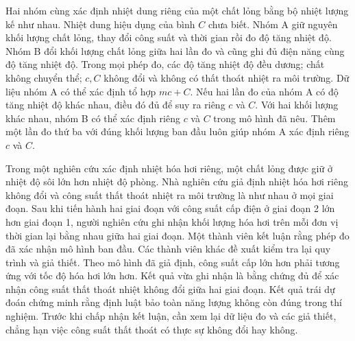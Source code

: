 \begin{ex}
Hai nhóm cùng xác định nhiệt dung riêng của một chất lỏng bằng bộ nhiệt lượng kế như nhau. Nhiệt dung hiệu dụng của bình $C$ chưa biết. Nhóm A giữ nguyên khối lượng chất lỏng, thay đổi công suất và thời gian rồi đo độ tăng nhiệt độ. Nhóm B đổi khối lượng chất lỏng giữa hai lần đo và cũng ghi đủ điện năng cùng độ tăng nhiệt độ. Trong mọi phép đo, các độ tăng nhiệt độ đều dương; chất không chuyển thể; $c,C$ không đổi và không có thất thoát nhiệt ra môi trường.
\choiceTF
{\True Dữ liệu nhóm A có thể xác định tổ hợp $mc+C$.}
{Nếu hai lần đo của nhóm A có độ tăng nhiệt độ khác nhau, điều đó đủ để suy ra riêng $c$ và $C$.}
{\True Với hai khối lượng khác nhau, nhóm B có thể xác định riêng $c$ và $C$ trong mô hình đã nêu.}
{Thêm một lần đo thứ ba với đúng khối lượng ban đầu luôn giúp nhóm A xác định riêng $c$ và $C$.}
\end{ex}

\begin{ex}
Trong một nghiên cứu xác định nhiệt hóa hơi riêng, một chất lỏng được giữ ở nhiệt độ sôi lớn hơn nhiệt độ phòng. Nhà nghiên cứu giả định nhiệt hóa hơi riêng không đổi và công suất thất thoát nhiệt ra môi trường là như nhau ở mọi giai đoạn. Sau khi tiến hành hai giai đoạn với công suất cấp điện ở giai đoạn 2 lớn hơn giai đoạn 1, người nghiên cứu ghi nhận khối lượng hóa hơi trên mỗi đơn vị thời gian lại bằng nhau giữa hai giai đoạn.  Một thành viên kết luận rằng phép đo đã xác nhận mô hình ban đầu. Các thành viên khác đề xuất kiểm tra lại quy trình và giả thiết.
\choiceTF
{\True Theo mô hình đã giả định, công suất cấp lớn hơn phải tương ứng với tốc độ hóa hơi lớn hơn.}
{Kết quả vừa ghi nhận là bằng chứng đủ để xác nhận công suất thất thoát nhiệt không đổi giữa hai giai đoạn.}
{Kết quả trái dự đoán chứng minh rằng định luật bảo toàn năng lượng không còn đúng trong thí nghiệm.}
{\True Trước khi chấp nhận kết luận, cần xem lại dữ liệu đo và các giả thiết, chẳng hạn việc công suất thất thoát có thực sự không đổi hay không.}
\end{ex}

